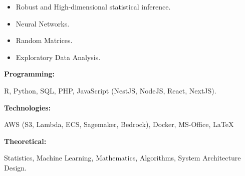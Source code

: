 \documentclass[9pt]{developercv} %
\begin{document}
\begin{minipage}[t]{0.46\textwidth}
    \vspace{-6pt}

    \begin{itemize}[noitemsep]
        \item Robust and High-dimensional statistical inference.
        \item Neural Networks.
        \item Random Matrices.
        \item Exploratory Data Analysis.
    \end{itemize}

\end{minipage}
\hfill %
\begin{minipage}[t]{0.46\textwidth}
    \vspace{-6pt}

    \begin{minipage}[t]{0.25\textwidth}
        \textbf{Programming:}
    \end{minipage}
    \hfill
    \begin{minipage}[t]{0.7\textwidth}
        R, Python, SQL, PHP, JavaScript (NestJS, NodeJS, React, NextJS).
    \end{minipage}
    \vspace{4mm}

    \begin{minipage}[t]{0.25\textwidth}
        \textbf{Technologies: }
    \end{minipage}
    \hfill
    \begin{minipage}[t]{0.7\textwidth}
        AWS (S3, Lambda, ECS, Sagemaker, Bedrock), Docker, MS-Office, \LaTeX
    \end{minipage}
    \vspace{4mm}

    \begin{minipage}[t]{0.2\textwidth}
        \textbf{Theoretical:}
    \end{minipage}
    \hfill
    \begin{minipage}[t]{0.75\textwidth}
        Statistics, Machine Learning, Mathematics, Algorithms, System Architecture Design.
    \end{minipage}

\end{minipage}
\end{document}
